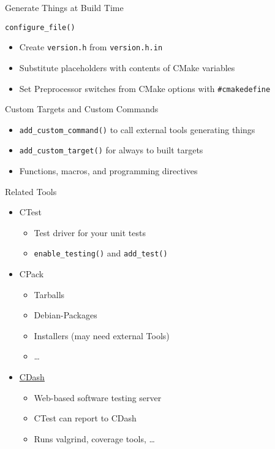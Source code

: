 \documentclass[t]{beamer}
\begin{document}
\begin{frame}{Generate Things at Build Time}
    \begin{block}{\texttt{configure\_file()}}
        \begin{itemize}
            \item Create \texttt{version.h} from
                \texttt{version.h.in}
            \item Substitute placeholders with contents of CMake
                variables
            \item Set Preprocessor switches from CMake options with
                \texttt{\#cmakedefine}
        \end{itemize}
    \end{block}

    \pause

    \begin{block}{Custom Targets and Custom Commands}
        \begin{itemize}
            \item \texttt{add\_custom\_command()} to call external tools
                generating things
            \item \texttt{add\_custom\_target()} for always to built
                targets
            \item Functions, macros, and programming directives
        \end{itemize}
    \end{block}
\end{frame}

\begin{frame}{Related Tools}
    \begin{itemize}
        \item CTest
            \begin{itemize}
                \item Test driver for your unit tests
                \item \texttt{enable\_testing()} and \texttt{add\_test()}
            \end{itemize}
        \item CPack
            \begin{itemize}
                \item Tarballs
                \item Debian-Packages
                \item Installers (may need external Tools)
                \item …
            \end{itemize}
        \item \href{https://www.cdash.org/}{CDash}
            \begin{itemize}
                \item Web-based software testing server
                \item CTest can report to CDash
                \item Runs valgrind, coverage tools, …
            \end{itemize}
    \end{itemize}
\end{frame}
\end{document}
